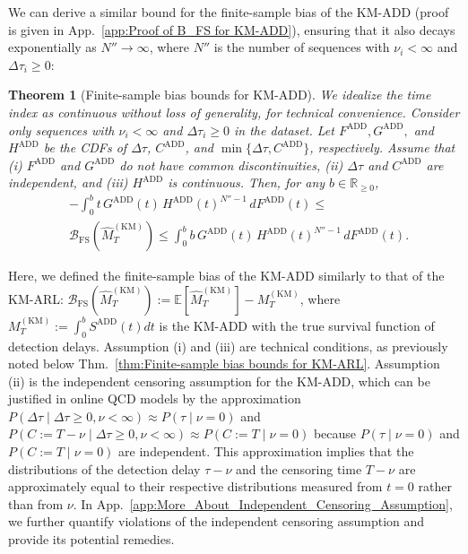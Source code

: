 \documentclass{article}
\theoremstyle{plain}
\newtheorem{theorem}{Theorem}[section]
\theoremstyle{definition}
\theoremstyle{remark}
\def\nn{\nonumber \\ }
\def\mbr{\mathbb{R}}
\def\mbe{\mathbb{E}}
\begin{document}
We can derive a similar bound for the finite-sample bias of the KM-ADD (proof is given in App.~\ref{app:Proof of B_FS for KM-ADD}), ensuring that it also decays exponentially as $N'' \rightarrow \infty$, where $N''$ is the number of sequences with $\nu_i < \infty$ and $\Delta \tau_i \geq 0$:
\begin{theorem}[Finite-sample bias bounds for KM-ADD] \label{thm:Finite-sample bias bounds for KM-ADD}
    We idealize the time index as continuous without loss of generality, for technical convenience.
    Consider only sequences with $\nu_i < \infty$ and $\Delta \tau_i \geq 0$ in the dataset.
    Let $F^\mathrm{ADD}, G^\mathrm{ADD},$ and $H^\mathrm{ADD}$ be the CDFs of $\Delta\tau$, $C^\mathrm{ADD}$, and $\min\{\Delta\tau, C^\mathrm{ADD}\}$, respectively. 
    Assume that (i) $F^\mathrm{ADD}$ and $G^\mathrm{ADD}$ do not have common discontinuities,  (ii) $\Delta\tau$ and $C^\mathrm{ADD}$ are independent, and (iii) $H^\mathrm{ADD}$ is continuous. Then, for any $b \in \mbr_{\geq 0}$,
    \begin{align}
        &-\int_0^{b} t \,G^\mathrm{ADD}(t)\,{H^\mathrm{ADD}}(t)^{N''-1}\,dF^\mathrm{ADD}(t) 
        \leq \nn
        &\mathcal{B}_\mathrm{FS}(\hat{M}_T^\mathrm{(KM)}) 
        \leq 
        \int_0^{b} b\,G^\mathrm{ADD}(t)\,{H^\mathrm{ADD}}(t)^{N''-1}\,dF^\mathrm{ADD}(t).
    \end{align}
\end{theorem}
Here, we defined the finite-sample bias of the KM-ADD similarly to that of the KM-ARL:
$\mathcal{B}_\mathrm{FS} (\hat{M}_T^\mathrm{(KM)}) := \mbe[\hat{M}_T^\mathrm{(KM)}] - M_T^\mathrm{(KM)}$, where
$M_T^\mathrm{(KM)} := \int_0^b S^\mathrm{ADD}(t) dt$ is the KM-ADD with the true survival function of detection delays.
Assumption (i) and (iii) are technical conditions, as previously noted below Thm.~\ref{thm:Finite-sample bias bounds for KM-ARL}.
Assumption (ii) is the independent censoring assumption for the KM-ADD, which can be justified in online QCD models by the approximation $P(\Delta \tau \mid \Delta \tau \geq 0, \nu < \infty) \approx P(\tau \mid \nu=0)$ and $P(C:=T-\nu \mid \Delta \tau \geq 0, \nu < \infty) \approx P(C:= T \mid \nu = 0)$ because $P(\tau \mid \nu=0)$ and $P(C:= T \mid \nu = 0)$ are independent.
This approximation implies that the distributions of the detection delay $\tau - \nu$ and the censoring time $T - \nu$ are approximately equal to their respective distributions measured from $t = 0$ rather than from $\nu$.
In App.~\ref{app:More_About_Independent_Censoring_Assumption}, we further quantify violations of the independent censoring assumption and provide its potential remedies.
\end{document}
